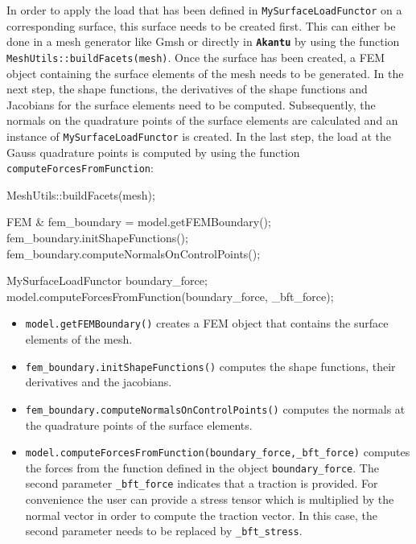 \documentclass[a4paper,11pt]{book}
\newcommand{\akantu}{{\texttt{\textbf{Akantu}}}\xspace}
\newcommand{\code}[1]{\texttt{#1}}
\begin{document}
In order to apply the load that has been defined in \code{MySurfaceLoadFunctor} on a corresponding surface, this surface needs to be created first. This can either be done in a mesh generator like Gmsh or directly in \akantu by using the function \code{MeshUtils::buildFacets(mesh)}. Once the surface has been created, a FEM object containing the surface elements of the mesh needs to be generated. In the next step, the shape functions, the derivatives of the shape functions and Jacobians for the surface elements need to be computed. Subsequently, the normals on the quadrature points of the surface elements are calculated and an instance of \code{MySurfaceLoadFunctor} is created. In the last step, the load at the Gauss quadrature points is computed by using the function \code{computeForcesFromFunction}:
\begin{cpp}
  MeshUtils::buildFacets(mesh);

  FEM & fem_boundary = model.getFEMBoundary();
  fem_boundary.initShapeFunctions();
  fem_boundary.computeNormalsOnControlPoints();

  MySurfaceLoadFunctor boundary_force;  
  model.computeForcesFromFunction(boundary_force, _bft_force);
\end{cpp} 
\begin{itemize}
\item\code{model.getFEMBoundary()} creates a FEM object that contains the surface elements of the mesh.
\item\code{fem\_boundary.initShapeFunctions()} computes the shape functions, their derivatives and the jacobians.
\item\code{fem\_boundary.computeNormalsOnControlPoints()} computes the normals at the quadrature points of the surface elements.
\item\code{model.computeForcesFromFunction(boundary\_force,\_bft\_force)} computes the forces from the function defined in the object \code{boundary\_force}. The second parameter \code{\_bft\_force} indicates that a traction is provided. For convenience the user can provide a stress tensor which is multiplied by the normal vector in order to compute the traction vector. In this case, the second parameter needs to be replaced by  \code{\_bft\_stress}.
\end{itemize}
  
\end{document}
